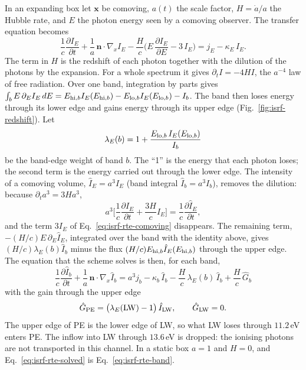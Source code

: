 In an expanding box let $\boldsymbol{x}$ be comoving, $a(t)$ the scale factor,
$H=\dot a/a$ the Hubble rate, and $E$ the photon energy seen by a comoving
observer. The transfer equation becomes \citep{GnedinAbel2001}
\begin{equation}
  \frac{1}{c}\frac{\partial I_E}{\partial t}
  + \frac{1}{a}\,\boldsymbol{n}\cdot\nabla_{\!x} I_E
  - \frac{H}{c}\Big(E\,\frac{\partial I_E}{\partial E} - 3\,I_E\Big)
  = j_E - \kappa_E\,I_E .
  \label{eq:isrf-rte-comoving}
\end{equation}
The term in $H$ is the redshift of each photon together with the dilution of
the photons by the expansion. For a whole spectrum it gives
$\partial_t I=-4HI$, the $a^{-4}$ law of free radiation. Over one band,
integration by parts gives
$\int_b E\,\partial_E I_E\,dE = E_{{\rm hi},b}I_E(E_{{\rm hi},b})
- E_{{\rm lo},b}I_E(E_{{\rm lo},b}) - I_b$. The band then loses energy through
its lower edge and gains energy through its upper edge
(Fig.~\ref{fig:isrf-redshift}). Let
\begin{equation}
  \lambda_E(b) = 1 + \frac{E_{{\rm lo},b}\,I_E(E_{{\rm lo},b})}{I_b}
  \label{eq:isrf-lambdaE}
\end{equation}
be the band-edge weight of band $b$. The ``1'' is the energy that each photon
loses; the second term is the energy carried out through the lower edge. The
intensity of a comoving volume, $\hat I_E=a^3 I_E$ (band integral
$\hat I_b=a^3I_b$), removes the dilution: because $\partial_t a^3=3Ha^3$,
\begin{equation*}
  a^3\Big[\frac{1}{c}\frac{\partial I_E}{\partial t}+\frac{3H}{c}I_E\Big]
  =\frac{1}{c}\frac{\partial \hat I_E}{\partial t},
\end{equation*}
and the term $3I_E$ of Eq.~\eqref{eq:isrf-rte-comoving} disappears. The
remaining term, $-(H/c)E\,\partial_E\hat I_E$, integrated over the band with
the identity above, gives $(H/c)\lambda_E(b)\hat I_b$ minus the flux
$(H/c)E_{{\rm hi},b}\hat I_E(E_{{\rm hi},b})$ through the upper edge. The
equation that the scheme solves is then, for each band,
\begin{equation}
  \boxed{\;
  \frac{1}{c}\frac{\partial \hat I_b}{\partial t}
  + \frac{1}{a}\,\boldsymbol{n}\cdot\nabla_{\!x}\hat I_b
  = a^3 j_b
  - \kappa_b\,\hat I_b
  - \frac{H}{c}\,\lambda_E(b)\,\hat I_b
  + \frac{H}{c}\,\hat G_b \;}
  \label{eq:isrf-rte-solved}
\end{equation}
with the gain through the upper edge
\begin{equation}
  \hat G_{\rm PE} = \big(\lambda_E({\rm LW})-1\big)\,\hat I_{\rm LW},
  \qquad
  \hat G_{\rm LW} = 0 .
  \label{eq:isrf-gain}
\end{equation}
The upper edge of PE is the lower edge of LW, so what LW loses through
$11.2$\,eV enters PE. The inflow into LW through $13.6$\,eV is dropped: the
ionising photons are not transported in this channel. In a static box $a=1$
and $H=0$, and Eq.~\eqref{eq:isrf-rte-solved} is Eq.~\eqref{eq:isrf-rte-band}.

